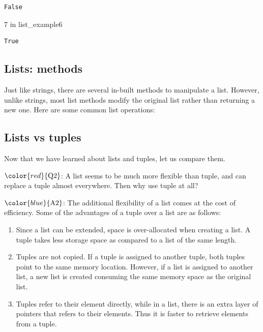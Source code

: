 \documentclass[
  letterpaper,
  DIV=11,
  numbers=noendperiod]{scrreprt}
\newenvironment{Shaded}{\begin{snugshade}}{\end{snugshade}}
\newcommand{\DecValTok}[1]{\textcolor[rgb]{0.68,0.00,0.00}{#1}}
\newcommand{\KeywordTok}[1]{\textcolor[rgb]{0.00,0.23,0.31}{#1}}
\newcommand{\NormalTok}[1]{\textcolor[rgb]{0.00,0.23,0.31}{#1}}
\begin{document}
\begin{verbatim}
False
\end{verbatim}

\begin{Shaded}
\begin{Highlighting}[]
\DecValTok{7} \KeywordTok{in}\NormalTok{ list\_example6}
\end{Highlighting}
\end{Shaded}

\begin{verbatim}
True
\end{verbatim}

\hypertarget{lists-methods}{%
\subsection{Lists: methods}\label{lists-methods}}

Just like strings, there are several in-built methods to manipulate a
list. However, unlike strings, most list methods modify the original
list rather than returning a new one. Here are some common list
operations:

\hypertarget{lists-vs-tuples}{%
\subsection{Lists vs tuples}\label{lists-vs-tuples}}

Now that we have learned about lists and tuples, let us compare them.

\(\color{red}{\text{Q2}}\): A list seems to be much more flexible than
tuple, and can replace a tuple almost everywhere. Then why use tuple at
all?

\(\color{blue}{\text{A2}}\): The additional flexibility of a list comes
at the cost of efficiency. Some of the advantages of a tuple over a list
are as follows:

\begin{enumerate}
\def\labelenumi{\arabic{enumi}.}
\item
  Since a list can be extended, space is over-allocated when creating a
  list. A tuple takes less storage space as compared to a list of the
  same length.
\item
  Tuples are not copied. If a tuple is assigned to another tuple, both
  tuples point to the same memory location. However, if a list is
  assigned to another list, a new list is created consuming the same
  memory space as the original list.
\item
  Tuples refer to their element directly, while in a list, there is an
  extra layer of pointers that refers to their elements. Thus it is
  faster to retrieve elements from a tuple.
\end{enumerate}
\end{document}
